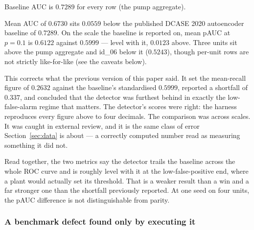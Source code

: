 \documentclass[11pt]{article}
\begin{document}
\noindent Baseline AUC is $0.7289$ for every row (the pump aggregate).

Mean AUC of $0.6730$ sits $0.0559$ below the published DCASE 2020 autoencoder
baseline of $0.7289$. On the scale the baseline is reported on, mean pAUC at
$p{=}0.1$ is $0.6122$ against $0.5999$ --- level with it, $0.0123$ above. Three
units sit above the pump aggregate and id\_06 below it ($0.5243$), though
per-unit rows are not strictly like-for-like (see the caveats below).

This corrects what the previous version of this paper said. It set the
mean-recall figure of $0.2632$ against the baseline's standardised $0.5999$,
reported a shortfall of $0.337$, and concluded that the detector was furthest
behind in exactly the low-false-alarm regime that matters. The detector's scores
were right: the harness reproduces every figure above to four decimals. The
comparison was across scales. It was caught in external review, and it is the
same class of error Section~\ref{sec:data} is about --- a correctly computed
number read as measuring something it did not.

Read together, the two metrics say the detector trails the baseline across the
whole ROC curve and is roughly level with it at the low-false-positive end,
where a plant would actually set its threshold. That is a weaker result than a
win and a far stronger one than the shortfall previously reported. At one seed
on four units, the pAUC difference is not distinguishable from parity.

\subsubsection{A benchmark defect found only by executing it}
\end{document}
